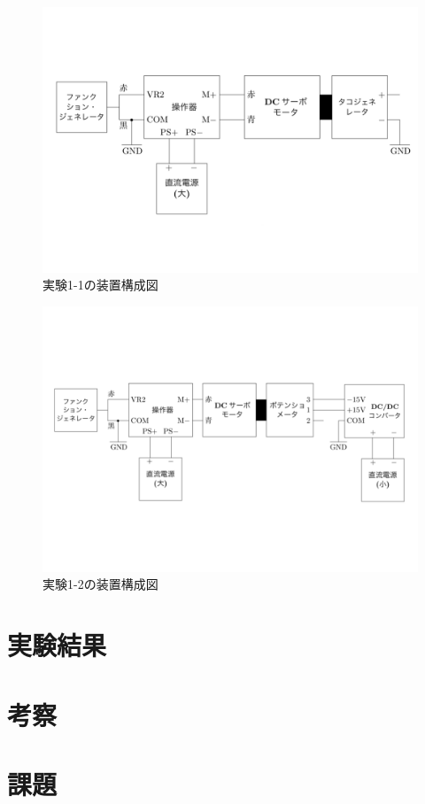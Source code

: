 \documentclass[uplatex, 11pt,a4j, titlepage]{jsarticle}
\begin{document}
\begin{figure}[h]
    \centering
    \includegraphics[width=12cm]{fig1.pdf}
    \caption{実験1-1の装置構成図}
    \label{fig1}
\end{figure}

\begin{figure}[h]
    \centering
    \includegraphics[width=12cm]{fig2.pdf}
    \caption{実験1-2の装置構成図}
    \label{fig2}
\end{figure}

\newpage

\section{実験結果}


\section{考察}
\section{課題}
\end{document}
